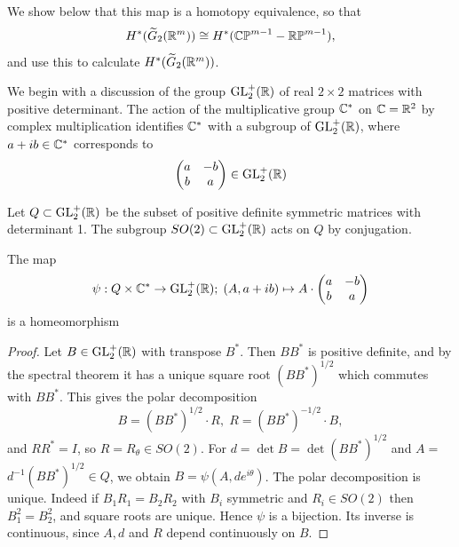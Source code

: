 We show below that this map is a homotopy equivalence, so that
\[
  H^*( {\widetilde{G}_{2}( {{\mathbb{R}}^m}) })  \cong  H^*( {{\mathbb{CP}}^{m- 1}- \mathbb{RP}^{m- 1}}),
\]
and use this to calculate $H^*( {\widetilde{G}_{2}( {{\mathbb{R}}^m}) })$.

We begin with a discussion of the group $\mathrm{GL}_{2}^{ + }( \mathbb{R})$ of real $2 \times  2$ matrices with positive 
determinant. The action of the multiplicative group ${\mathbb{C}}^*$ on $\mathbb{C} = {\mathbb{R}}^{2}$ by complex multiplication 
identifies ${\mathbb{C}}^*$ with a subgroup of $\mathrm{GL}_{2}^{ + }( \mathbb{R})$, where $a + {ib} \in  {\ensuremath{\mathbb{C}}}^*$ corresponds to
\begin{align}\label{eq:20-12}
  \begin{pmatrix} 
    a & - b \\  
    b & a 
  \end{pmatrix} 
  \in  \mathrm{GL}_{2}^{ + }( \mathbb{R})
\end{align}

Let $Q \subset  \mathrm{GL}_{2}^{ + }( \mathbb{R})$ be the subset of positive definite symmetric matrices with 
determinant 1. The subgroup ${SO}( 2)  \subset  {\ensuremath{\mathrm{GL}}_2^+}( \mathbb{R})$ acts on $Q$ by conjugation.


\begin{lemma}\label{lemma:20-4}
  The map
  \[
    \psi: Q \times  {\ensuremath{\mathbb{C}}}^* \rightarrow  {\ensuremath{\mathrm{GL}}_2^+}( \mathbb{R}) ;\;( {A,a + {ib}}) 
    \mapsto  A\cdot\begin{pmatrix} a & - b \\  b & a \end{pmatrix}
  \]
  is a homeomorphism
\end{lemma}

\begin{proof}
  Let $B \in  {\ensuremath{\mathrm{GL}}_2^+}( \mathbb{R})$ with transpose ${B}^*$. Then $B{B}^*$ is positive definite, 
  and by the spectral theorem it has a unique square root ${( B{B}^*) }^{1/2}$ which commutes with $B{B}^*$. 
  This gives the polar decomposition
  \[
    B = {( B{B}^*) }^{1/2} \cdot  R,\;R = {( B{B}^*) }^{-1/2} \cdot  B,
  \]
  and $R{R}^* = I$, so $R = {R}_{\theta } \in  {SO}( 2)$. For $d = \det B = \det {( B{B}^*) }^{1/2}$
  and $A =$  ${d}^{-1}{( B{B}^*) }^{1/2} \in  Q$, we obtain $B = \psi ( {A,d{e}^{i\theta }})$. The polar 
  decomposition is unique. Indeed if ${B}_{1}{R}_{1} = {B}_{2}{R}_{2}$ with ${B}_{i}$ symmetric 
  and ${R}_{i} \in  {SO}( 2)$ then ${B}_{1}^{2} = {B}_{2}^{2}$, and square roots are unique. Hence $\psi$ 
  is a bijection. Its inverse is continuous, since $A,d$ and $R$ depend continuously on $B$.
\end{proof}


